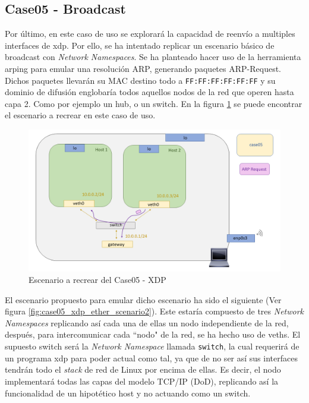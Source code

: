 \subsection{Case05 - Broadcast}
\label{xdp_ether_case05}

Por último, en este caso de uso se explorará la capacidad de reenvío a multiples interfaces de \gls{xdp}. Por ello, se ha intentado replicar un escenario básico de broadcast con \textit{Network Namespaces}. Se ha planteado hacer uso de la herramienta arping para emular una resolución ARP, generando paquetes ARP-Request. Dichos paquetes llevarán su MAC destino todo a \texttt{FF:FF:FF:FF:FF:FF} y su dominio de difusión englobaría todos aquellos nodos de la red que operen hasta capa 2. Como por ejemplo un hub, o un switch. En la figura \ref{fig:case05_xdp_ether_scenario1} se puede encontrar el escenario a recrear en este caso de uso.\\
\par
\begin{figure}[ht]
    \centering
    \includegraphics[width=14cm]{archivos/img/dev/xdp/case05/scenario_01.png}
    \caption{Escenario a recrear del Case05 - XDP}
    \label{fig:case05_xdp_ether_scenario1}
\end{figure}

El escenario propuesto para emular dicho escenario ha sido el siguiente (Ver figura \ref{fig:case05_xdp_ether_scenario2}). Este estaría compuesto de tres \textit{Network Namespaces} replicando así cada una de ellas un nodo independiente de la red, después, para intercomunicar cada ``nodo" de la red, se ha hecho uso de \gls{veth}s. El supuesto switch será la \textit{Network Namespace} llamada \texttt{switch}, la cual requerirá de un programa \gls{xdp} para poder actual como tal, ya que de no ser así sus interfaces tendrán todo el \textit{stack} de red de Linux por encima de ellas. Es decir, el nodo implementará todas las capas del modelo TCP/IP (DoD), replicando así la funcionalidad de un hipotético host y no actuando como un switch.\\
\par


